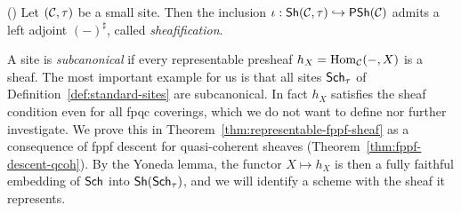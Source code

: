 \begin{lemma}[Sheafification]\label{lem:sheafification}
	(\cite[][p.~134]{MacLaneMoerdijk1992})
	Let $(\mathcal{C},\tau)$ be a small site. Then the inclusion $\iota:\mathsf{Sh}\!\left(\mathcal{C},\tau\right)\hookrightarrow\mathsf{PSh}\!\left(\mathcal{C}\right)$ admits a left adjoint $(-)^\sharp$, called \emph{sheafification}.
\end{lemma}

\begin{remark}\label{rem:representable-forward}
	A site is \emph{subcanonical} if every representable presheaf $h_X=\operatorname{Hom}_{\mathcal{C}}(-,X)$ is a sheaf. The most important example for us is that all sites $\mathsf{Sch}_\tau$ of Definition~\ref{def:standard-sites} are subcanonical. In fact $h_X$ satisfies the sheaf condition even for all fpqc coverings, which we do not want to define nor further investigate. We prove this in Theorem~\ref{thm:representable-fppf-sheaf} as a consequence of fppf descent for quasi-coherent sheaves (Theorem~\ref{thm:fppf-descent-qcoh}). By the Yoneda lemma, the functor $X\mapsto h_X$ is then a fully faithful embedding of $\mathsf{Sch}$ into $\mathsf{Sh}\!\left(\mathsf{Sch}_\tau\right)$, and we will identify a scheme with the sheaf it represents.
\end{remark}
